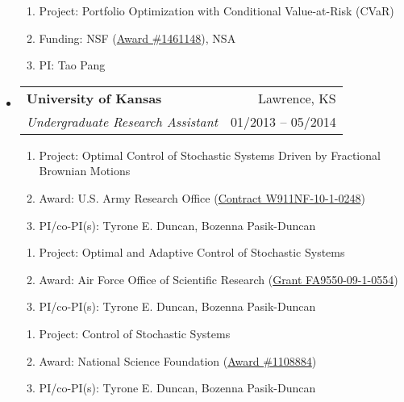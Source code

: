 \documentclass[letterpaper,10pt]{article}
\makeatletter
\newcommand{\subheadingtwolines}[4]{
\begin{tabular*}{6.45in}{l@{\cftdotfill{\cftsecdotsep}\extracolsep{\fill}}r}
#1 & #2 \\
#3 & #4 \\
\end{tabular*}}
\makeatother
\begin{document}
\begin{itemize}[leftmargin=0.4cm, itemsep=0.5cm]
\begin{enumerate}[leftmargin=0.5cm, itemsep=-0.05ex]
	\item[] Project: Portfolio Optimization with Conditional Value-at-Risk (CVaR)
	\item[] Funding: NSF (\href{https://www.nsf.gov/awardsearch/showAward?AWD_ID=1461148&HistoricalAwards=false}{Award \#1461148}), NSA
	\item[] PI: Tao Pang
\end{enumerate}


\item[] \subheadingtwolines{\bf University of Kansas}{Lawrence, KS}{\it Undergraduate Research Assistant}{01/2013 -- 05/2014}

\begin{enumerate}[leftmargin=0.5cm, itemsep=-0.05ex]
	\item[] Project: Optimal Control of Stochastic Systems Driven by Fractional Brownian Motions
	\item[] Award: U.S. Army Research Office (\href{http://www.dtic.mil/dtic/tr/fulltext/u2/a614716.pdf}{Contract W911NF-10-1-0248})
	\item[] PI/co-PI(s): Tyrone E. Duncan, Bozenna Pasik-Duncan
\end{enumerate}


\begin{enumerate}[leftmargin=0.5cm, itemsep=-0.05ex]
	\item[] Project: Optimal and Adaptive Control of Stochastic Systems
	\item[] Award: Air Force Office of Scientific Research (\href{http://www.dtic.mil/dtic/tr/fulltext/u2/a567576.pdf}{Grant FA9550-09-1-0554})
	\item[] PI/co-PI(s): Tyrone E. Duncan, Bozenna Pasik-Duncan
\end{enumerate}


\begin{enumerate}[leftmargin=0.5cm, itemsep=-0.05ex]
	\item[] Project: Control of Stochastic Systems
	\item[] Award: National Science Foundation (\href{https://www.nsf.gov/awardsearch/showAward?AWD_ID=1108884&HistoricalAwards=false}{Award \#1108884})
	\item[] PI/co-PI(s): Tyrone E. Duncan, Bozenna Pasik-Duncan
\end{enumerate}

\end{itemize}
\end{document}
